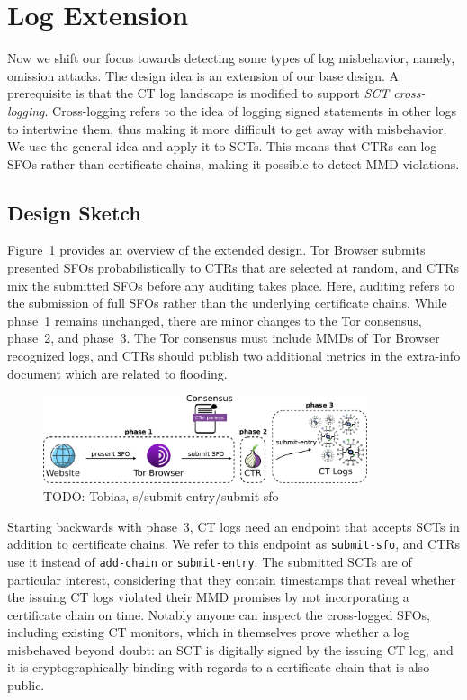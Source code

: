 \section{Log Extension} \label{sec:log}
Now we shift our focus towards detecting some types of log misbehavior, namely,
omission attacks.  The design idea is an
extension of our base design.  A prerequisite is that the CT log landscape
is modified to support \emph{SCT cross-logging}.  Cross-logging refers to the
idea of logging signed statements in other logs to intertwine
them, thus making it more difficult to get away with
misbehavior.  We use the general idea and apply it to SCTs.  This means that
CTRs can log SFOs rather than certificate chains, making it possible to detect
MMD violations.

\subsection{Design Sketch}
Figure~\ref{fig:ext-log} provides an overview of the extended design.  Tor
Browser submits presented SFOs probabilistically to CTRs that are selected
at random, and CTRs mix the submitted SFOs before any auditing takes place.
Here, auditing refers to the submission of full SFOs rather than the underlying
certificate chains.  While phase~1 remains unchanged, there are minor changes
to the Tor consensus, phase~2, and phase~3.  The Tor consensus must include MMDs
of Tor Browser recognized logs, and CTRs should publish two additional metrics
in the extra-info document which are related to flooding.

\begin{figure}
    \centering
    \includegraphics[width=0.85\textwidth]{img/design-log}
	\caption{TODO: Tobias, s/submit-entry/submit-sfo}
    \label{fig:ext-log}
\end{figure}

Starting backwards with phase~3, CT logs need an endpoint that accepts SCTs in
addition to certificate chains.  We refer to this endpoint as
\texttt{submit-sfo}, and CTRs use it instead of \texttt{add-chain} or
\texttt{submit-entry}.  The submitted SCTs are of particular interest,
considering that they contain timestamps that reveal whether the issuing CT logs
violated their MMD promises by not incorporating a certificate chain on time.
Notably anyone can inspect the cross-logged SFOs, including existing CT
monitors, which in themselves prove whether a log misbehaved beyond doubt:
	an SCT is digitally signed by the issuing CT log, and
	it is cryptographically binding with regards to a certificate chain that
		is also public.

